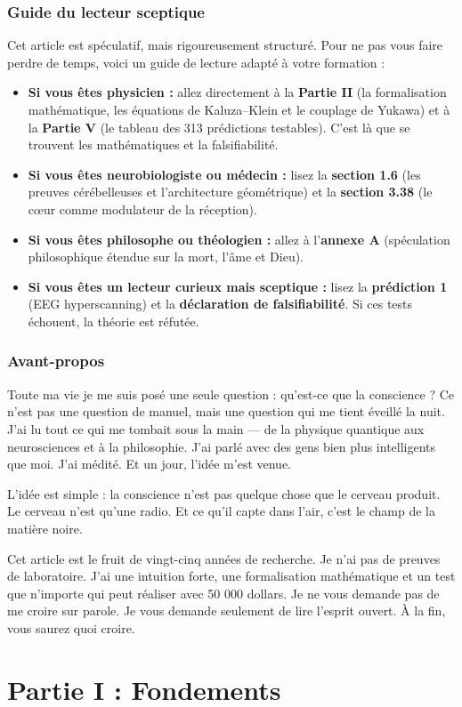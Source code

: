 \documentclass[11pt,a4paper]{article}
\begin{document}
\section*{Guide du lecteur sceptique}
Cet article est spéculatif, mais rigoureusement structuré. Pour ne pas vous faire perdre de temps, voici un guide de lecture adapté à votre formation :
\begin{itemize}
    \item \textbf{Si vous êtes physicien :} allez directement à la \textbf{Partie II} (la formalisation mathématique, les équations de Kaluza--Klein et le couplage de Yukawa) et à la \textbf{Partie V} (le tableau des 313 prédictions testables). C'est là que se trouvent les mathématiques et la falsifiabilité.
    \item \textbf{Si vous êtes neurobiologiste ou médecin :} lisez la \textbf{section 1.6} (les preuves cérébelleuses et l'architecture géométrique) et la \textbf{section 3.38} (le cœur comme modulateur de la réception).
    \item \textbf{Si vous êtes philosophe ou théologien :} allez à l'\textbf{annexe A} (spéculation philosophique étendue sur la mort, l'âme et Dieu).
    \item \textbf{Si vous êtes un lecteur curieux mais sceptique :} lisez la \textbf{prédiction 1} (EEG hyperscanning) et la \textbf{déclaration de falsifiabilité}. Si ces tests échouent, la théorie est réfutée.
\end{itemize}

\section*{Avant-propos}
Toute ma vie je me suis posé une seule question : qu'est-ce que la conscience ? Ce n'est pas une question de manuel, mais une question qui me tient éveillé la nuit. J'ai lu tout ce qui me tombait sous la main --- de la physique quantique aux neurosciences et à la philosophie. J'ai parlé avec des gens bien plus intelligents que moi. J'ai médité. Et un jour, l'idée m'est venue.

L'idée est simple : la conscience n'est pas quelque chose que le cerveau produit. Le cerveau n'est qu'une radio. Et ce qu'il capte dans l'air, c'est le champ de la matière noire.

Cet article est le fruit de vingt-cinq années de recherche. Je n'ai pas de preuves de laboratoire. J'ai une intuition forte, une formalisation mathématique et un test que n'importe qui peut réaliser avec 50 000 dollars. Je ne vous demande pas de me croire sur parole. Je vous demande seulement de lire l'esprit ouvert. À la fin, vous saurez quoi croire.

\newpage
\part*{Partie I : Fondements}
\end{document}

